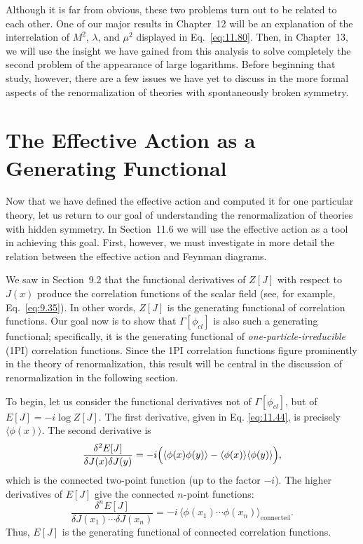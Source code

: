 Although it is far from obvious, these two problems turn out to be related to
each other.  One of our major results in Chapter~12 will be an explanation of
the interrelation of $M^2$, $\lambda$, and $\mu^2$ displayed in
Eq.~\eqref{eq:11.80}.  Then, in Chapter~13, we will use the insight we have
gained from this analysis to solve completely the second problem of the
appearance of large logarithms.  Before beginning that study, however, there
are a few issues we have yet to discuss in the more formal aspects of the
renormalization of theories with spontaneously broken symmetry.

\section{The Effective Action as a Generating Functional}

Now that we have defined the effective action and computed it for one
particular theory, let us return to our goal of understanding the
renormalization of theories with hidden symmetry.  In Section~11.6 we will use
the effective action as a tool in achieving this goal.  First, however, we
must investigate in more detail the relation between the effective action and
Feynman diagrams.

We saw in Section~9.2 that the functional derivatives of $Z[J]$ with respect
to $J(x)$ produce the correlation functions of the scalar field (see, for
example, Eq.~\eqref{eq:9.35}).  In other words, $Z[J]$ is the generating
functional of correlation functions.  Our goal now is to show that
$\Gamma[\phi_{cl}]$ is also such a generating functional; specifically, it is
the generating functional of \emph{one-particle-irreducible} (1PI)
correlation functions.  Since the 1PI correlation functions figure
prominently in the theory of renormalization, this result will be central in
the discussion of renormalization in the following section.

To begin, let us consider the functional derivatives not of $\Gamma[\phi_{cl}]$,
but of $E[J] = -i\log Z[J]$.  The first derivative, given in Eq.
\eqref{eq:11.44}, is precisely $\langle\phi(x)\rangle$.  The second
derivative is
\begin{equation}
  \frac{\delta^2 E[J]}{\delta J(x)\delta J(y)}
  = -i\Bigl( \langle\phi(x)\phi(y)\rangle
    - \langle\phi(x)\rangle\langle\phi(y)\rangle \Bigr) ,
  \label{eq:11.82}
\end{equation}
which is the connected two-point function (up to the factor $-i$).  The
higher derivatives of $E[J]$ give the connected $n$-point functions:
\begin{equation}
  \frac{\delta^n E[J]}{\delta J(x_1)\cdots\delta J(x_n)} = -i\,
    \langle\phi(x_1)\cdots\phi(x_n)\rangle_{\mathrm{connected}} .
  \label{eq:11.83}
\end{equation}
Thus, $E[J]$ is the generating functional of connected correlation functions.

